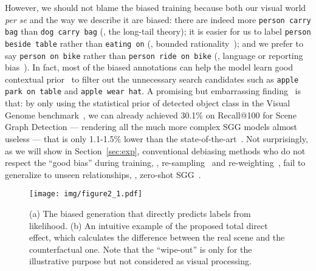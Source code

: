 \documentclass[10pt,twocolumn,letterpaper]{article}
\begin{document}
However, we should not blame the biased training because both our visual world \textit{per se} and the way we describe it are biased: there are indeed more \texttt{person carry bag} than \texttt{dog carry bag} (\ie, the long-tail theory); it is easier for us to label \texttt{person beside table} rather than \texttt{eating on} (\ie, bounded rationality~\cite{simon1990bounded}); and we prefer to say \texttt{person on bike} rather than \texttt{person ride on bike} (\ie, language or reporting bias~\cite{misra2016seeing}). In fact, most of the biased annotations can help the model learn good contextual prior~\cite{lu2016visual,zellers2018neural} to filter out the unnecessary search candidates such as \texttt{apple park on table} and \texttt{apple wear hat}. A promising but embarrassing finding~\cite{zellers2018neural} is that: by only using the statistical prior of detected object class in the Visual Genome benchmark~\cite{krishna2017visual}, we can already achieved 30.1\% on Recall@100 for Scene Graph Detection --- rendering all the much more complex SGG models almost useless --- that is only 1.1-1.5\% lower than the state-of-the-art~\cite{chen2019counterfactual, tang2019learning, zhang2019graphical}. Not surprisingly, as we will show in Section~\ref{sec:exp}, conventional debiasing methods who do not respect the ``good bias'' during training, \eg, re-sampling~\cite{he2009learning} and re-weighting~\cite{lin2017focal}, fail to generalize to unseen relationships, \ie, zero-shot SGG~\cite{lu2016visual}.

\begin{figure}[t!]
   \begin{minipage}[b]{1\linewidth}
   \centerline{\texttt{[image: img/figure2\_1.pdf]}}
   \end{minipage}
   \caption{(a) The biased generation that directly predicts labels from likelihood. (b) An intuitive example of the proposed total direct effect, which calculates the difference between the real scene and the counterfactual one. Note that the ``wipe-out'' is only for the illustrative purpose but not considered as visual processing.}
   \label{fig:2} \vspace{-0.2in}
\end{figure}
\end{document}
